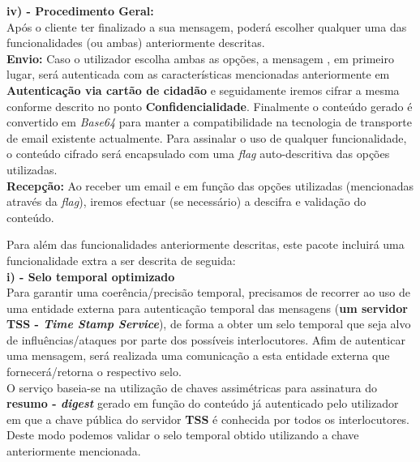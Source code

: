 \documentclass[times, 10pt,twocolumn]{article}
\begin{document}
\noindent \textbf{iv) - Procedimento Geral:} \\
\indent Ap\'os o cliente ter finalizado a sua mensagem, poder\'a escolher qualquer uma das funcionalidades (ou ambas) anteriormente descritas. \\
\indent \indent \textbf{Envio:} Caso o utilizador escolha ambas as op\c{c}\~oes, a mensagem , em primeiro lugar, ser\'a autenticada com as caracter\'isticas mencionadas anteriormente em \textbf{Autentica\c{c}\~ao via cart\~ao de cidad\~ao}  e seguidamente iremos cifrar a mesma conforme descrito no ponto \textbf{Confidencialidade}. Finalmente o conte\'udo gerado \'e convertido em \emph{Base64} para manter a compatibilidade na tecnologia de transporte de email existente actualmente. Para assinalar o uso de qualquer funcionalidade, o conte\'udo cifrado ser\'a encapsulado com uma \emph{flag} auto-descritiva das op\c{c}\~oes utilizadas.\\
\indent \indent \textbf{Recep\c{c}\~ao:} Ao receber um email e em fun\c{c}\~ao das op\c{c}\~oes utilizadas (mencionadas atrav\'es da \emph{flag}), iremos efectuar (se necess\'ario) a descifra e valida\c{c}\~ao do conte\'udo.


Para al\'em das funcionalidades anteriormente descritas, este pacote incluir\'a uma funcionalidade extra a ser descrita de seguida:\\

\noindent \textbf{i) - Selo temporal optimizado}\\
\indent Para garantir uma coer\^encia/precis\~ao temporal, precisamos de recorrer ao uso de uma entidade externa para autentica\c{c}\~ao temporal das mensagens (\textbf{um servidor TSS - \emph{Time Stamp Service}}), de forma a obter um selo temporal que seja alvo de influ\^encias/ataques por parte dos poss\'iveis interlocutores. Afim de autenticar uma mensagem, ser\'a realizada uma comunica\c{c}\~ao a esta entidade externa que fornecer\'a/retorna o respectivo selo.\\
\indent O servi\c{c}o baseia-se na utiliza\c{c}\~ao de chaves assim\'etricas para assinatura do \textbf{resumo - \emph{digest}} gerado em fun\c{c}\~ao do conte\'udo j\'a autenticado pelo utilizador em que a chave p\'ublica do servidor \textbf{TSS} \'e conhecida por todos os interlocutores. Deste modo podemos validar o selo temporal obtido utilizando a chave anteriormente mencionada.

\end{document}

